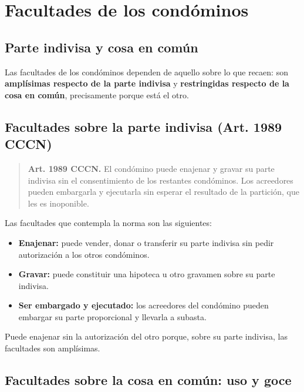 \documentclass[12pt,oneside]{book}
\begin{document}
\chapter{Facultades de los condóminos}

\section{Parte indivisa y cosa en común}

Las facultades de los condóminos dependen de aquello sobre lo que recaen: son \textbf{amplísimas respecto de la parte indivisa} y \textbf{restringidas respecto de la cosa en común}, precisamente porque está el otro.

\section{Facultades sobre la parte indivisa (Art. 1989 CCCN)}

\begin{quote}
\textbf{Art. 1989 CCCN.} El condómino puede enajenar y gravar su parte indivisa sin el consentimiento de los restantes condóminos. Los acreedores pueden embargarla y ejecutarla sin esperar el resultado de la partición, que les es inoponible.
\end{quote}

Las facultades que contempla la norma son las siguientes:

\begin{itemize}
    \item \textbf{Enajenar:} puede vender, donar o transferir su parte indivisa sin pedir autorización a los otros condóminos.
    \item \textbf{Gravar:} puede constituir una hipoteca u otro gravamen sobre su parte indivisa.
    \item \textbf{Ser embargado y ejecutado:} los acreedores del condómino pueden embargar su parte proporcional y llevarla a subasta.
\end{itemize}

Puede enajenar sin la autorización del otro porque, sobre su parte indivisa, las facultades son amplísimas.

\section{Facultades sobre la cosa en común: uso y goce}
\end{document}
